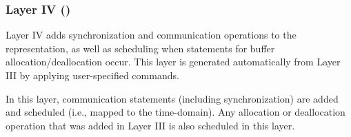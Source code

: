 \subsubsection{Layer IV (\Layerfour)}
\label{layer4}

Layer IV adds synchronization and communication operations to the representation,  as well as scheduling when statements for buffer allocation/deallocation occur.  This layer is generated automatically from Layer III by applying user-specified commands.

In this layer, communication statements (including synchronization) are added and scheduled (i.e., mapped to the time-\processor domain).
Any allocation or deallocation operation that was added in Layer III is also scheduled in this layer.
